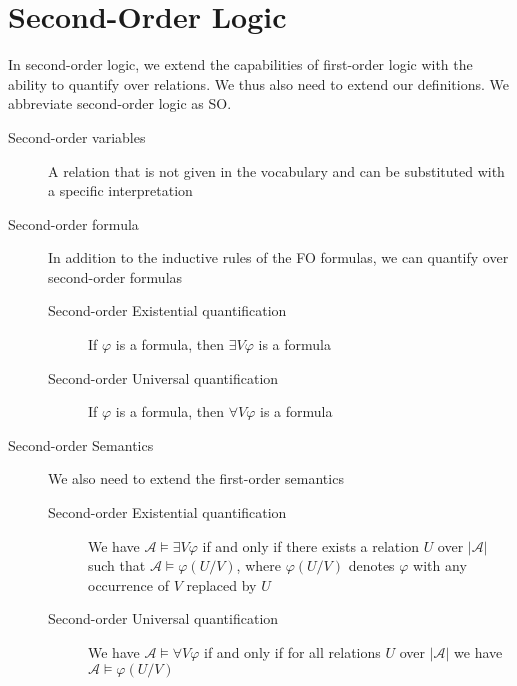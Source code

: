 \section{Second-Order Logic}\label{sec:second-order-logic}
In second-order logic, we extend the capabilities of first-order logic with the ability to quantify over relations.
We thus also need to extend our definitions.
We abbreviate second-order logic as SO\@.
\begin{description}
    \item[Second-order variables] A relation that is not given in the vocabulary and can be substituted with a specific interpretation
    \item[Second-order formula] In addition to the inductive rules of the FO formulas, we can quantify over second-order formulas
    \begin{description}
        \item[Second-order Existential quantification] If $\varphi$ is a formula, then $\exists V\varphi$ is a formula
        \item[Second-order Universal quantification] If $\varphi$ is a formula, then $\forall V\varphi$ is a formula
    \end{description}
    \item[Second-order Semantics] We also need to extend the first-order semantics
    \begin{description}
        \item[Second-order Existential quantification]  We have $\mathcal{A} \models \exists V\varphi$ if and only if there exists a relation $U$ over $|\mathcal{A}|$ such that $\mathcal{A} \models \varphi(U / V)$, where $\varphi(U / V)$ denotes $\varphi$ with any occurrence of $V$ replaced by $U$
        \item[Second-order Universal quantification] We have $\mathcal{A} \models \forall V\varphi$ if and only if for all relations $U$ over $|\mathcal{A}|$ we have $\mathcal{A} \models \varphi(U / V)$
    \end{description}
\end{description}


